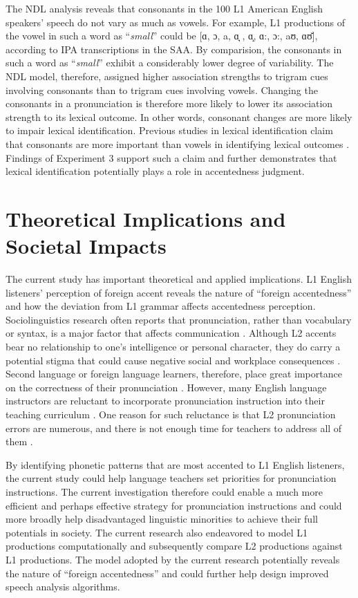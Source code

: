 The NDL analysis reveals that consonants in the 100 L1 American English speakers’ speech do not vary as much as vowels. For example, L1 productions of the vowel in such a word as “\textit{small}” could be [ɑ, ɔ, a, ɑ̘ , ɑ̝, ɑ:, ɔ:, aʊ, ɑʊ̆], according to IPA transcriptions in the SAA. By comparision, the consonants in such a word as “\textit{small}” exhibit a considerably lower degree of variability. The NDL model, therefore, assigned higher association strengths to trigram cues involving consonants than to trigram cues involving vowels. Changing the consonants in a pronunciation is therefore more likely to lower its association strength to its lexical outcome. In other words, consonant changes are more likely to impair lexical identification. Previous studies in lexical identification claim that consonants are more important than vowels in identifying lexical outcomes \citep{Nespor_2003}. Findings of Experiment 3 support such a claim and further demonstrates that lexical identification potentially plays a role in accentedness judgment.

\section{Theoretical Implications and Societal Impacts}

The current study has important theoretical and applied implications. L1 English listeners’ perception of foreign accent reveals the nature of “foreign accentedness” and how the deviation from L1 grammar affects accentedness perception. Sociolinguistics research often reports that pronunciation, rather than vocabulary or syntax, is a major factor that affects communication \citep{Grant_2014}. Although L2 accents bear no relationship to one’s intelligence or personal character, they do carry a potential stigma that could cause negative social and workplace consequences \citep{Gluszek_2010}. Second language or foreign language learners, therefore, place great importance on the correctness of their pronunciation \citep{Waniek-Klimczak_2015}. However, many English language instructors are reluctant to incorporate pronunciation instruction into their teaching curriculum \citep{Thomson_2014}. One reason for such reluctance is that L2 pronunciation errors are numerous, and there is not enough time for teachers to address all of them \citep{Munro_2006, Thomson_2014}. 

By identifying phonetic patterns that are most accented to L1 English listeners, the current study could help language teachers set priorities for pronunciation instructions. The current investigation therefore could enable a much more efficient and perhaps effective strategy for pronunciation instructions and could more broadly help disadvantaged linguistic minorities to achieve their full potentials in society. The current research also endeavored to model L1 productions computationally and subsequently compare L2 productions against L1 productions. The model adopted by the current research potentially reveals the nature of “foreign accentedness” and could further help design improved speech analysis algorithms. 

